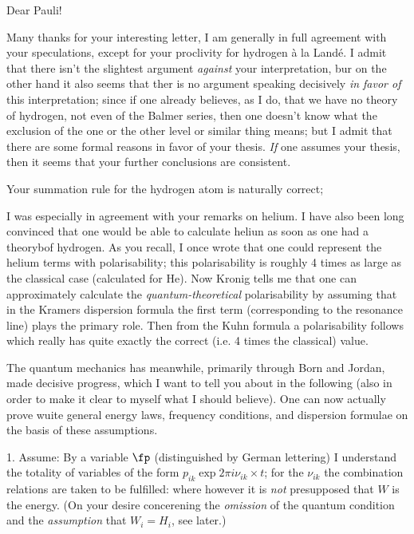 \date{September 18, 1925}

Dear Pauli!

Many thanks for your interesting letter, I am generally in full agreement with your speculations, except for your proclivity for hydrogen \`a la Land\'e. I admit that there isn't the slightest argument \textit{against} your interpretation, bur on the other hand it also seems that ther is no argument speaking decisively \textit{in favor of} this interpretation; since if one already believes, as I do, that we have no theory of hydrogen, not even of the Balmer series, then one doesn't know what the exclusion of the one or the other level or similar thing means; but I admit that there are some formal reasons in favor of your thesis. \textit{If} one assumes your thesis, then it seems that your further conclusions are consistent.

Your summation rule for the hydrogen atom is naturally correct; 

I was especially in agreement with your remarks on helium. I have also been long convinced that one would be able to calculate heliun as soon as one had a theorybof hydrogen. As you recall, I once wrote that one could  represent the helium terms with polarisability; this polarisability is roughly 4 times as large as the classical case (calculated for He). Now Kronig tells me that one can approximately calculate the \textit{quantum-theoretical} polarisability by assuming that in the Kramers dispersion formula the first term (corresponding to the resonance line) plays the primary role. Then from the Kuhn formula a polarisability follows which really has quite exactly the correct (i.e. 4 times the classical) value.

The quantum mechanics  has meanwhile, primarily through Born and Jordan, made decisive progress, which I want to tell you about in the following (also in order to make it clear to myself what I should believe). One can now actually prove wuite general energy laws, frequency conditions, and dispersion formulae on the basis of these assumptions.

1. Assume: By a variable $\fp$ (distinguished by German lettering) I understand the totality of variables of the form $p_{ik}\exp{2\pi i \nu_{ik} \times t}$; for the $\nu_{ik}$ the combination relations are taken to be fulfilled:
where however it is \textit{not} presupposed that $W$ is the energy. (On your desire concerening the \textit{omission} of the quantum condition and the \textit{assumption} that $W_i=H_i$, see later.)

